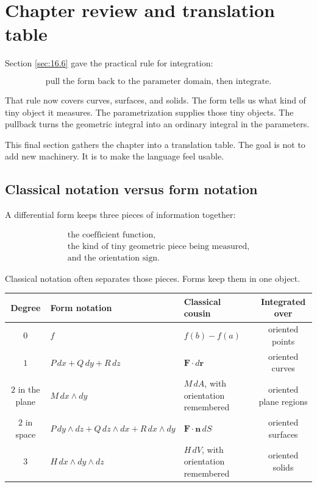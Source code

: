 \section{Chapter review and translation table}
\label{sec:16.7}

Section \ref{sec:16.6} gave the practical rule for integration:

\[
\boxed{
    \text{pull the form back to the parameter domain, then integrate.}
}
\]

That rule now covers curves, surfaces, and solids.  The form tells us what kind of tiny
object it measures.  The parametrization supplies those tiny objects.  The pullback
turns the geometric integral into an ordinary integral in the parameters.

This final section gathers the chapter into a translation table.  The goal is not to add
new machinery.  It is to make the language feel usable.

\subsection{Classical notation versus form notation}

A differential form keeps three pieces of information together:

\[
\boxed{
\begin{array}{c}
\text{the coefficient function,}\\[1mm]
\text{the kind of tiny geometric piece being measured,}\\[1mm]
\text{and the orientation sign.}
\end{array}
}
\]

Classical notation often separates those pieces.  Forms keep them in one object.

\begin{center}
\begin{tabularx}{\textwidth}{c|>{\centering\arraybackslash}X|>{\centering\arraybackslash}X|c}
\textbf{Degree} & \textbf{Form notation} & \textbf{Classical cousin} & \textbf{Integrated over} \\ \hline
\(0\) &
\(f\) &
\(f(b)-f(a)\) &
oriented points \\[1mm] \hline
\(1\) &
\(P\,dx+Q\,dy+R\,dz\) &
\(\mathbf F\cdot d\mathbf r\) &
oriented curves \\[1mm] \hline
\(2\) in the plane &
\(M\,dx\wedge dy\) &
\(M\,dA\), with orientation remembered &
oriented plane regions \\[1mm] \hline
\(2\) in space &
\(P\,dy\wedge dz+Q\,dz\wedge dx+R\,dx\wedge dy\) &
\(\mathbf F\cdot\mathbf n\,dS\) &
oriented surfaces \\[1mm] \hline
\(3\) &
\(H\,dx\wedge dy\wedge dz\) &
\(H\,dV\), with orientation remembered &
oriented solids
\end{tabularx}
\end{center}

